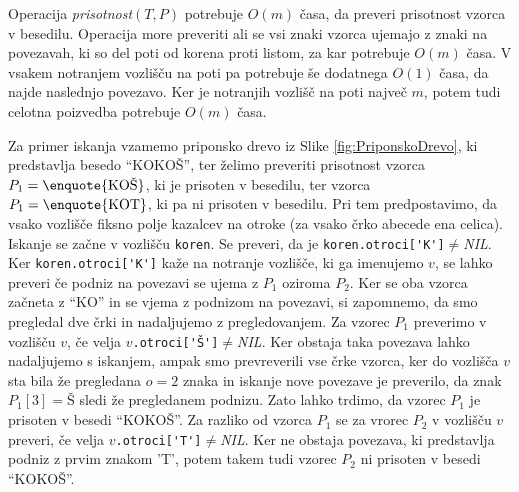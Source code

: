 Operacija \textit{prisotnost}$(T,P)$ potrebuje $O(m)$ časa, da preveri prisotnost vzorca v besedilu. Operacija more preveriti ali se vsi znaki vzorca ujemajo z znaki na povezavah, ki so del poti od korena proti listom, za kar potrebuje $O(m)$ časa. V vsakem notranjem vozlišču na poti pa potrebuje še dodatnega $O(1)$ časa, da najde naslednjo povezavo. Ker je notranjih vozlišč na poti največ $m$, potem tudi celotna poizvedba potrebuje $O(m)$ časa.

Za primer iskanja vzamemo priponsko drevo iz Slike \ref{fig:PriponskoDrevo}, ki predstavlja besedo \enquote{KOKOŠ}, ter želimo preveriti prisotnost vzorca $P_1=\text{\enquote{KOŠ}}$, ki je prisoten v besedilu, ter vzorca $P_1=\text{\enquote{KOT}}$, ki pa ni prisoten v besedilu. Pri tem predpostavimo, da vsako vozlišče fiksno polje kazalcev na otroke (za vsako črko abecede ena celica). Iskanje se začne v vozlišču \verb|koren|. Se preveri, da je \verb|koren.otroci['K']|$\ne$\textit{NIL}. Ker \verb|koren.otroci['K']| kaže na notranje vozlišče, ki ga imenujemo $v$, se lahko preveri če podniz na povezavi se ujema z $P_1$ oziroma $P_2$. Ker se oba vzorca začneta z \enquote{KO} in se vjema z podnizom na povezavi, si zapomnemo, da smo pregledal dve črki in nadaljujemo z pregledovanjem. Za vzorec $P_1$ preverimo v vozlišču $v$, če velja $v$\verb|.otroci['Š']|$\ne$\textit{NIL}. Ker obstaja taka povezava lahko nadaljujemo s iskanjem, ampak smo prevreverili vse črke vzorca, ker do vozlišča $v$ sta bila že pregledana $o=2$ znaka in iskanje nove povezave je preverilo, da znak $P_1[3]=Š$ sledi že pregledanem podnizu. Zato lahko trdimo, da vzorec $P_1$ je prisoten v besedi \enquote{KOKOŠ}. Za razliko od vzorca $P_1$ se za vrorec $P_2$ v vozlišču $v$ preveri, če velja  $v$\verb|.otroci['T']|$\ne$\textit{NIL}. Ker ne obstaja povezava, ki predstavlja podniz z prvim znakom 'T', potem takem tudi vzorec $P_2$ ni prisoten v besedi \enquote{KOKOŠ}.
